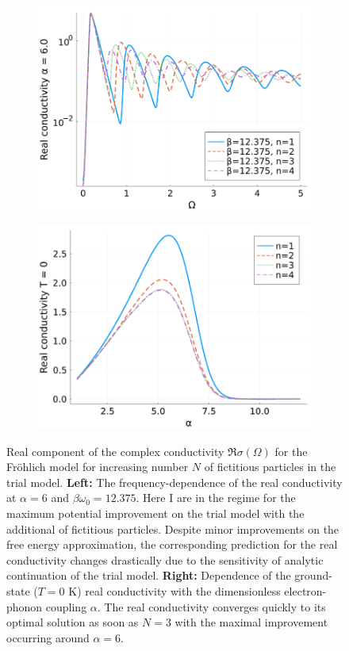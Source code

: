 \begin{figure}[!tbp]
    \centering
  \begin{subfigure}[b]{0.49\textwidth}
    \centering
    \includegraphics[width=\textwidth]{figures/cond_freq_bad.png}
  \end{subfigure}
  \hfill
  \begin{subfigure}[b]{0.49\textwidth}
    \centering
    \includegraphics[width=\textwidth]{figures/cond_alpha.png}
  \end{subfigure}
  \caption{Real component of the complex conductivity $\Re \sigma(\Omega)$ for the Fr\"ohlich model for increasing number $N$ of fictitious particles in the trial model. \textbf{Left:} The frequency-dependence of the real conductivity at $\alpha = 6$ and $\beta\omega_0=12.375$. Here I are in the regime for the maximum potential improvement on the trial model with the additional of fictitious particles. Despite minor improvements on the free energy approximation, the corresponding prediction for the real conductivity changes drastically due to the sensitivity of analytic continuation of the trial model. \textbf{Right:} Dependence of the ground-state ($T = 0$ K) real conductivity with the dimensionless electron-phonon coupling $\alpha$. The real conductivity converges quickly to its optimal solution as soon as $N=3$ with the maximal improvement occurring around $\alpha = 6$.}
  \label{fig:multidyn}
\end{figure}
